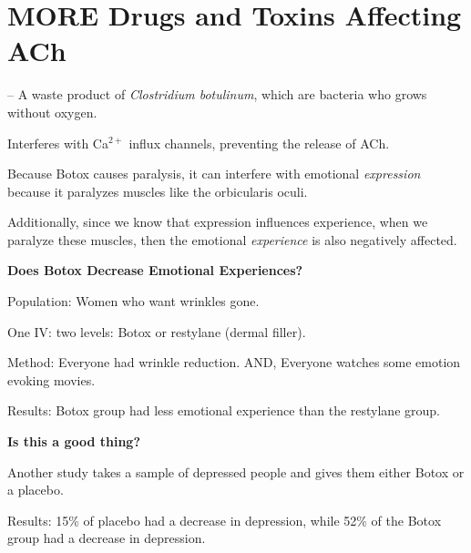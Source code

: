 
\section{MORE Drugs and Toxins Affecting ACh}

\begin{coloredlist}
    \item {} -- A waste product of \textit{Clostridium botulinum}, which are bacteria who grows without oxygen.
    \begin{coloredlist}
        \item Interferes with Ca\(^{2+}\) influx channels, preventing the release of ACh.
        \item Because Botox causes paralysis, it can interfere with emotional \textit{expression} because it paralyzes muscles like the orbicularis oculi.
        \item Additionally, since we know that expression influences experience, when we paralyze these muscles, then the emotional \textit{experience} is also negatively affected.
        \item \textbf{Does Botox Decrease Emotional Experiences?}
        \begin{coloredlist}
            \item Population: Women who want wrinkles gone.
            \item One IV: two levels: Botox or restylane (dermal filler).
            \item Method: Everyone had wrinkle reduction. AND, Everyone watches some emotion evoking movies.
            \item Results: Botox group had less emotional experience than the restylane group.
            \item \textbf{Is this a good thing?}
            \begin{coloredlist}
                \item Another study takes a sample of depressed people and gives them either Botox or a placebo.
                \item Results: 15\% of placebo had a decrease in depression, while 52\% of the Botox group had a decrease in depression.
            \end{coloredlist}
        \end{coloredlist}

\end{coloredlist}
\end{coloredlist}
